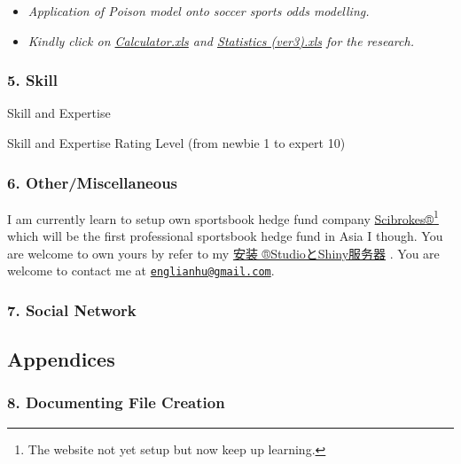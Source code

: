 \documentclass[]{article}
\providecommand{\tightlist}{%
  \setlength{\itemsep}{0pt}\setlength{\parskip}{0pt}}
\let\rmarkdownfootnote\footnote%
\def\footnote{\protect\rmarkdownfootnote}
\begin{document}
\begin{itemize}
\tightlist
\item
  \emph{Application of Poison model onto soccer sports odds modelling.}
\item
  \emph{Kindly click on
  \href{https://github.com/scibrokes/owner/blob/master/data/Calculator.xls}{Calculator.xls}
  and
  \href{https://github.com/scibrokes/owner/blob/master/data/Statistics\%20(ver3).xls}{Statistics
  (ver3).xls} for the research.}
\end{itemize}

\subsubsection{5. Skill}\label{skill}

Skill and Expertise

Skill and Expertise Rating Level (from newbie 1 to expert 10)

\hypertarget{htmlwidget-ef996e30556b9c9871a3}{}

\subsubsection{6. Other/Miscellaneous}\label{othermiscellaneous}

I am currently learn to setup own sportsbook hedge fund company
\href{https://github.com/scibrokes}{Scibrokes®}\footnote{The website not
  yet setup but now keep up learning.} which will be the first
professional sportsbook hedge fund in Asia I though. You are welcome to
own yours by refer to my
\href{https://github.com/Scibrokes/setup-rstudio-server}{安装
®StudioとShiny服务器} . You are welcome to contact me at
\href{mailto:englianhu@gmail.com}{\nolinkurl{englianhu@gmail.com}}.

\subsubsection{7. Social Network}\label{social-network}

\subsection{Appendices}\label{appendices}

\subsubsection{8. Documenting File
Creation}\label{documenting-file-creation}
\end{document}
